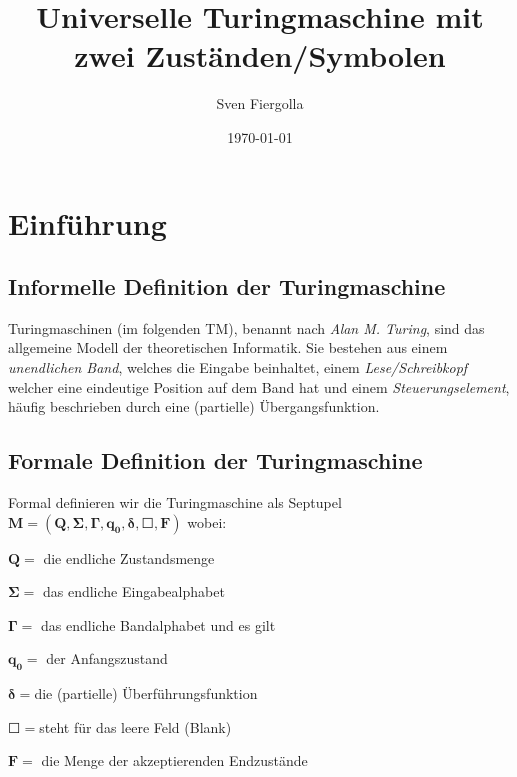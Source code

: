 \documentclass[12pt, a4paper, twoside]{article}
\author{Sven Fiergolla}
\title{Universelle Turingmaschine mit zwei Zuständen/Symbolen}
\date{\today}
\begin{document}
 
\maketitle


\section{Einführung}
\subsection{Informelle Definition der Turingmaschine}
Turingmaschinen (im folgenden TM), benannt nach \textit{Alan M. Turing}, sind das allgemeine Modell der theoretischen Informatik.
Sie bestehen aus einem \textit{unendlichen Band}, welches die Eingabe beinhaltet, einem \textit{Lese/Schreibkopf} welcher eine eindeutige Position auf dem Band hat und einem \textit{Steuerungselement}, häufig beschrieben durch eine (partielle) Übergangsfunktion.


\subsection{Formale Definition der Turingmaschine}
Formal definieren wir die Turingmaschine als Septupel $\mathbf{ M = (Q,\Sigma,\Gamma,q_0,\delta,\Square,F)} $
 wobei:

\begin{description}


 \item $\mathbf{ Q = }$ die endliche Zustandsmenge
 \item $\mathbf{ \Sigma = }$ das endliche Eingabealphabet
 \item $\mathbf{ \Gamma = }$ das endliche Bandalphabet und es gilt {\Sigma \subset \Gamma }
 \item $\mathbf{ q_0 = }$ der Anfangszustand
 \item $\mathbf{ \delta = }$die (partielle) Überführungsfunktion
 \item $\mathbf{ \Square = }$steht für das leere Feld (Blank)
 \item $\mathbf{F = }$ die Menge der akzeptierenden Endzustände

\end{description}

 
 
\end{document}
